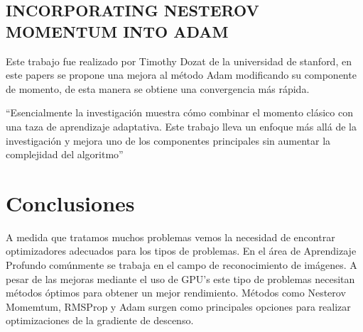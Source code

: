 \subsection{INCORPORATING NESTEROV MOMENTUM INTO ADAM}
Este trabajo fue realizado por Timothy Dozat de la universidad de stanford, en este papers se propone una mejora al método Adam modificando su componente de momento, de esta manera se obtiene una convergencia más rápida.

\textquotedblleft Esencialmente la investigación muestra cómo combinar el momento clásico con una taza de aprendizaje adaptativa. Este trabajo lleva un enfoque más allá de la investigación y mejora uno de los componentes principales sin aumentar la complejidad del algoritmo\textquotedblright \cite{NMIA}
\section{Conclusiones}
A medida que tratamos muchos problemas vemos la necesidad de encontrar optimizadores adecuados para los tipos de problemas. En el área de Aprendizaje Profundo comúnmente se trabaja en el campo de reconocimiento de imágenes. A pesar de las mejoras mediante el uso de GPU's este tipo de problemas necesitan métodos óptimos para obtener un mejor rendimiento. Métodos como Nesterov Momemtum, RMSProp y Adam surgen como principales opciones para realizar optimizaciones de la gradiente de descenso.

